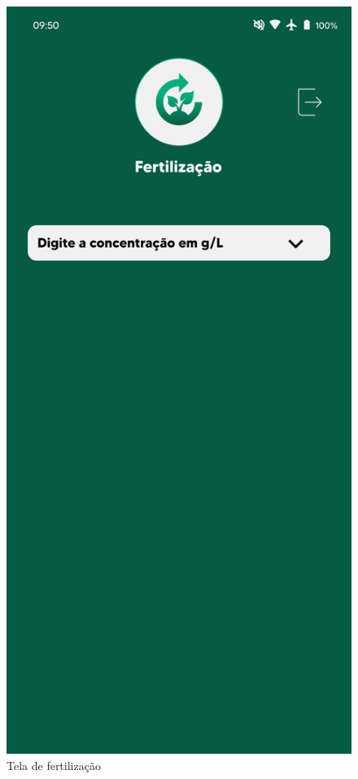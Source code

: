 \begin{figure}[!h]
\centering
\caption{Tela de fertilização}
\label{fig:picture9}
\includegraphics[scale=0.3]{Illustrations/Picture9.png}
\end{figure}
